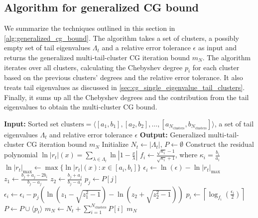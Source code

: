 \subsection{Algorithm for generalized CG bound}\label{sec:cg_multi_cluster_bound_algorithm}
We summarize the techniques outlined in this section in \cref{alg:generalized_cg_bound}. The algorithm takes a set of clusters, a possibly empty set of tail eigenvalues $\Lambda_t$ and a relative error tolerance $\epsilon$ as input and returns the generalized multi-tail-cluster CG iteration bound $m_N$. The algorithm iterates over all clusters, calculating the Chebyshev degree $p_i$ for each cluster based on the previous clusters' degrees and the relative error tolerance. It also treats tail eigenvalues as discussed in \cref{sec:cg_single_eigenvalue_tail_clusters}. Finally, it sums up all the Chebyshev degrees and the contribution from the tail eigenvalues to obtain the multi-cluster CG bound.
\begin{algorithm}[H]
    \caption{$\operatorname{GeneralizedCGIterationBound}(\text{clusters}, \Lambda_t, \epsilon)$}
    \begin{algorithmic}[1]
        \State \textbf{Input:} Sorted set $\text{clusters} = \langle[a_1, b_1], [a_2, b_2], \ldots, [a_{N_{\text{clusters}}}, b_{N_{\text{clusters}}}]\rangle$, a set of tail eigenvalues $\Lambda_t$ and relative error tolerance $\epsilon$
        \State \textbf{Output:} Generalized multi-tail-cluster CG iteration bound $m_N$
        \State Initialize $N_{t} \gets |\Lambda_{t}|$, $P \gets \emptyset$
        \State Construct the residual polynomial $\ln|r_{t}|(x) = \sum_{\lambda\in\Lambda_{t}} \ln\left|1 - \frac{x}{\lambda}\right|$
        \State $f_i \gets \frac{\sqrt{\kappa_i} - 1}{\sqrt{\kappa_i} + 1}$, where $\kappa_i = \frac{b_i}{a_i}$
        \State $\ln|r_{t}|_{\text{max}} \gets \max\{\ln|r_{t}|(x) : x \in [a_i, b_i]\}$
        \State $\epsilon_i \gets \ln(\epsilon) - \ln|r_{t}|_{\text{max}}$
         
        \State $z_1 \gets \frac{b_j + a_j - 2b_i}{b_j - a_j}$
        \State $z_2 \gets \frac{b_j + a_j}{b_j - a_j}$
        \State $p_j \gets P[j]$
        \State $\epsilon_i \gets \epsilon_i - p_j \left(\ln\left(z_1 - \sqrt{z_1^2 -1}\right) - \ln\left(z_2 + \sqrt{z_2^2 -1}\right)\right)$
        \EndFor
        \State $p_i \gets \left\lceil\log_{f_i}\left(\frac{\epsilon_i}{2}\right)\right\rceil$
        \State $P \gets P \cup \langle p_i \rangle$
        \EndFor
        \State $m_{N} \gets N_{t} + \sum_{i=1}^{N_{\text{clusters}}} P[i]$
        \State \Return $m_{N}$
    \end{algorithmic}
    \label{alg:generalized_cg_bound}
\end{algorithm}

